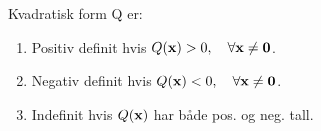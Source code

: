 Kvadratisk form Q er:
\begin{enumerate}
  \item Positiv definit hvis $Q(\mathbf{x})>0, \quad \forall \mathbf{x}\neq\mathbf{0}$.
  \item Negativ definit hvis $Q(\mathbf{x})<0, \quad \forall \mathbf{x}\neq\mathbf{0}$.
  \item Indefinit hvis $Q(\mathbf{x})$ har både pos. og neg. tall.
\end{enumerate}
